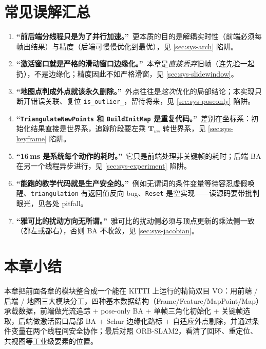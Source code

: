 \section*{常见误解汇总}
\begin{enumerate}
  \item \textbf{“前后端分线程只是为了并行加速。”}\ 更本质的目的是解耦实时性（前端必须每帧出结果）与精度（后端可慢慢优化到最优），见 \cref{sec:sys-arch} 陷阱。
  \item \textbf{“激活窗口就是严格的滑动窗口边缘化。”}\ 本章是\emph{直接丢弃}旧帧（连先验一起扔），不是边缘化；精度因此不如严格滑窗，见 \cref{sec:sys-slidewindow}。
  \item \textbf{“地图点判成外点就该永久删除。”}\ 外点往往是\emph{这次}优化的局部结论；本实现只断开错误关联、复位 \texttt{is\_outlier\_}，留待将来，见 \cref{sec:sys-poseonly} 陷阱。
  \item \textbf{“\texttt{TriangulateNewPoints} 和 \texttt{BuildInitMap} 是重复代码。”}\ 差别在坐标系：初始化结果直接是世界系，追踪阶段要左乘 $\mathbf{T}_{wc}$ 转世界系，见 \cref{sec:sys-keyframe} 陷阱。
  \item \textbf{“16\,ms 是系统每个动作的耗时。”}\ 它只是前端处理非关键帧的耗时；后端 BA 在另一个线程异步进行，见 \cref{sec:sys-experiment} 陷阱。
  \item \textbf{“能跑的教学代码就是生产安全的。”}\ 例如无谓词的条件变量等待容忍虚假唤醒、\texttt{triangulation} 有返回值反向 bug、\texttt{Reset} 是空实现——读源码要带批判眼光，见各处 pitfall。
  \item \textbf{“雅可比的扰动方向无所谓。”}\ 雅可比的扰动侧必须与顶点更新的乘法侧一致（都左或都右），否则 BA 不收敛，见 \cref{sec:sys-jacobian}。
\end{enumerate}

\section*{本章小结}

本章把前面各章的模块整合成一个能在 KITTI 上运行的精简双目 VO：用前端 / 后端 / 地图三大模块分工，四种基本数据结构（Frame/Feature/MapPoint/Map）承载数据，前端做光流追踪 + pose-only BA + 单帧三角化初始化 + 关键帧选取，后端做激活窗口局部 BA + Schur 边缘化路标 + 自适应外点剔除，并通过条件变量在两个线程间安全协作；最后对照 ORB-SLAM2，看清了回环、重定位、共视图等工业级要素的位置。

